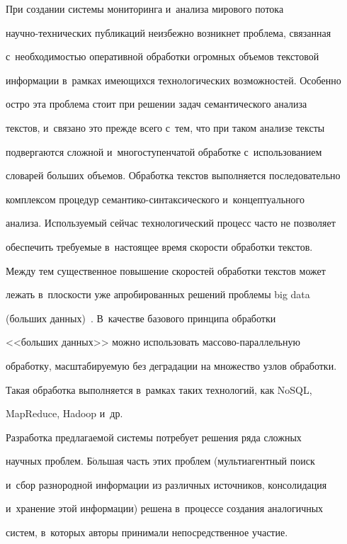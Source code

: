      


     При создании системы мониторинга и~анализа мирового потока 


научно-тех\-ни\-че\-ских публикаций неизбежно возникнет проблема, связанная 


с~необходимостью оперативной обработки огромных объемов текстовой 


информации в~рамках имеющихся технологических возможностей. Особенно 


остро эта проблема стоит при решении задач семантического анализа 


текстов, и~связано это прежде всего с~тем, что при таком анализе тексты 


подвергаются сложной и~многоступенчатой обработке с~использованием 


словарей больших объемов. Обработка текстов выполняется последовательно 


комплексом процедур се\-ман\-ти\-ко-син\-так\-си\-че\-ско\-го и~концептуального 


анализа. Используемый сейчас технологический процесс час\-то не позволяет 


обеспечить требуемые в~настоящее время скорости обработки текстов. 


Между тем существенное повышение скоростей обработки текстов может 


лежать в~плоскости уже апробированных решений проблемы big data 


(больших данных)~\cite{3-kl, 4-kl}. В~качестве базового принципа обработки 


<<больших данных>> можно использовать мас\-со\-во-па\-рал\-лель\-ную 


обработку, масштабируемую без деградации на множество узлов обработки. 


Такая обработка выполняется в~рамках таких технологий, как NoSQL, 


MapReduce, Hadoop и~др. 


     


     Разработка предлагаемой системы потребует решения ряда сложных 


научных проблем. Б$\acute{\mbox{о}}$льшая часть этих проблем (мультиагентный поиск 


и~сбор разнородной информации из различных источников, консолидация 


и~хранение этой информации) решена в~процессе создания аналогичных 


систем, в~которых авторы принимали непосредственное участие. 


